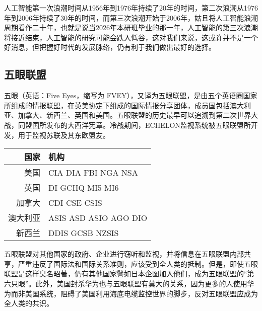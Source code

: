\documentclass{article}
\begin{document}
人工智能第一次浪潮时间从1956年到1976年持续了20年的时间，第二次浪潮从1976年到2006年持续了30年的时间，而第三次浪潮开始于2006年，姑且将人工智能浪潮周期看作二十年，也就是说当2026年本研班毕业的那一年，人工智能的第三次浪潮将接近结束，人工智能的研究可能会跌入低谷，这对我们来说，这或许并不是一个好消息，但把握好时代的发展脉络，仍有利于我们做出最好的选择。\par

\subsection{五眼联盟}
五眼（英语：Five Eyes，缩写为 FVEY），又译为五眼联盟，是由五个英语圈国家所组成的情报联盟，在英美协定下组成的国际情报分享团体，成员国包括澳大利亚、加拿大、新西兰、英国和美国。五眼联盟的历史最早可以追溯到第二次世界大战，同盟国所发布的大西洋宪章。冷战期间，ECHELON监视系统被五眼联盟所开发，用于监视苏联及其东欧盟友。\citep{a3}\citep{a4}\citep{a5}\par
\begin{table}[h]
    \centering
\begin{tabular}{rl}
    \hline
    国家 & 机构 \\
    \hline
    美国 & CIA DIA FBI NGA NSA\\ 
    英国 & DI GCHQ MI5 MI6 \\
    加拿大 & CDI CSE CSIS\\
    澳大利亚 & ASIS ASD ASIO AGO DIO \\
    新西兰 & DDIS GCSB NZSIS \\
    \hline
\end{tabular}
    \label{table1}
\end{table}
五眼联盟对其他国家的政府、企业进行窃听和监视，并将信息在五眼联盟内部共享，严重违反了国际法和国际关系准则，应该受到全人类的抵制。但是，即使五眼联盟是这样臭名昭著，仍有其他国家譬如日本企图加入他们，成为五眼联盟的“第六只眼”。此外，美国封杀华为也与五眼联盟有莫大的关系，因为更多的人使用华为而非美国系统，阻碍了美国利用海底电缆监控世界的脚步，反对五眼联盟应成为全人类的共识。\par
\end{document}
